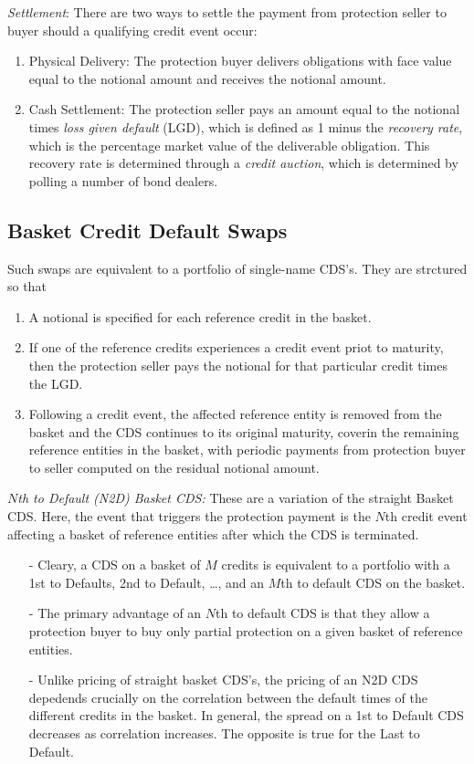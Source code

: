 \documentclass[a4paper,12pt]{scrartcl}
\begin{document}
{\sl Settlement}: There are two ways to settle the payment from 
protection seller to buyer should a qualifying credit event occur:
\begin{enumerate}
   \item Physical Delivery: The protection buyer delivers obligations
      with face value equal to the notional amount and receives
      the notional amount.
   \item Cash Settlement: The protection seller pays an amount equal 
      to the notional times \emph{loss given default} (LGD),
      which is defined as 1 minus the \emph{recovery rate}, which is
      the percentage market value of the deliverable obligation. This
      recovery rate is determined through a \emph{credit auction}, 
      which is determined by polling a number of bond dealers.
\end{enumerate}

\subsection{Basket Credit Default Swaps}

Such swaps are equivalent to a portfolio of single-name CDS's. 
They are strctured so that 
\begin{enumerate}
   \item A notional is specified for each reference credit in the 
      basket.
   \item If one of the reference credits experiences a credit event
      priot to maturity, then the protection seller pays 
      the notional for that particular credit times the LGD.
   \item Following a credit event, the affected reference entity is
      removed from the basket and the CDS continues to its original
      maturity, coverin the remaining reference entities in the
      basket, with periodic payments from protection buyer to seller
      computed on the residual notional amount.
\end{enumerate}
{\sl $N$th to Default (N2D) Basket CDS:} These are a variation of the
straight Basket CDS.  Here, the event that triggers the protection
payment is the $N$th credit event affecting a basket of 
reference entities after which the CDS is terminated.  
\begin{itemize}
   \item[-] Cleary, a CDS on a basket of $M$ credits is equivalent to 
      a portfolio with a 1st to Defaults, 2nd to Default, \dots,
      and an $M$th to default CDS on the basket.
   \item[-] The primary advantage of an $N$th to default CDS is that they
      allow a protection buyer to buy only partial protection on a given
      basket of reference entities.
   \item[-] Unlike pricing of straight basket CDS's, the pricing of an
      N2D CDS depedends crucially on the correlation between 
      the default times of the different credits in the basket. In 
      general, the spread on a 1st to Default CDS decreases as 
      correlation increases. The opposite is true for the Last to 
      Default.
\end{itemize}
\end{document}
